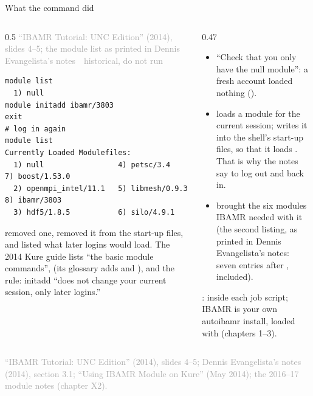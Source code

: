 \documentclass[aspectratio=169,11pt]{beamer}
\newcommand{\sourcecredit}[1]{\vfill\begin{flushright}\tiny\textcolor{DarkGray}{#1}\end{flushright}}
\newcommand{\hist}[1]{{\tiny\sffamily\textcolor{DarkGray}{#1\ \textbullet\ historical, do not run}}\par\nointerlineskip\vspace{0.3mm}}
\begin{document}
\begin{frame}[fragile]{What the  command did}
\label{fr:modulecmd}
\begin{columns}[T,onlytextwidth]
\begin{column}{0.5\textwidth}
\hist{``IBAMR Tutorial: UNC Edition'' (2014), slides 4--5; the module list as printed in Dennis Evangelista's notes}
\begin{lstlisting}[style=hist]
module list
  1) null
module initadd ibamr/3803
exit
# log in again
module list
Currently Loaded Modulefiles:
  1) null                 4) petsc/3.4            7) boost/1.53.0
  2) openmpi_intel/11.1   5) libmesh/0.9.3        8) ibamr/3803
  3) hdf5/1.8.5           6) silo/4.9.1
\end{lstlisting}
\vspace{1mm}
\scriptsize {} removed one,  removed it from the start-up files, and  listed what later logins would load. The 2014 Kure guide lists ``the basic module commands'',  (its glossary adds  and ), and the rule: initadd ``does not change your current session, only later logins.''
\end{column}
\begin{column}{0.47\textwidth}
\scriptsize
\begin{itemize}\setlength{\itemsep}{1pt}
  \item ``Check that you only have the null module'': a fresh account loaded nothing ().
  \item {} loads a module for the current session;  writes it into the shell's start-up files, so that it loads . That is why the notes say to log out and back in.
  \item {} brought the six modules IBAMR needed with it (the second listing, as printed in Dennis Evangelista's notes: seven entries after ,  included).
\end{itemize}
:  inside each job script; IBAMR is your own autoibamr install, loaded with  (chapters 1--3).
\end{column}
\end{columns}
\sourcecredit{``IBAMR Tutorial: UNC Edition'' (2014), slides 4--5; Dennis Evangelista's notes (2014), section 3.1; ``Using IBAMR Module on Kure'' (May 2014); the 2016--17 module notes (chapter X2).}
\end{frame}
\end{document}
